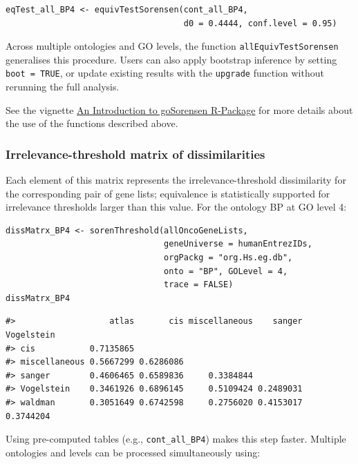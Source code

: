 \begin{verbatim}
eqTest_all_BP4 <- equivTestSorensen(cont_all_BP4,
                                    d0 = 0.4444, conf.level = 0.95)
\end{verbatim}

Across multiple ontologies and GO levels, the function \texttt{allEquivTestSorensen} generalises this procedure. Users can also apply bootstrap inference by setting \texttt{boot\ =\ TRUE}, or update existing results with the \texttt{upgrade} function without rerunning the full analysis.

See the vignette \href{https://www.bioconductor.org/packages/release/bioc/vignettes/goSorensen/inst/doc/goSorensen_Introduction.html}{An Introduction to goSorensen R-Package} for more details about the use of the functions described above.

\subsubsection{Irrelevance-threshold matrix of dissimilarities}\label{irrelevance-threshold-matrix-of-dissimilarities}

Each element of this matrix represents the irrelevance-threshold dissimilarity for the corresponding pair of gene lists; equivalence is statistically supported for irrelevance thresholds larger than this value. For the ontology BP at GO level 4:

\begin{verbatim}
dissMatrx_BP4 <- sorenThreshold(allOncoGeneLists,
                                geneUniverse = humanEntrezIDs, 
                                orgPackg = "org.Hs.eg.db",
                                onto = "BP", GOLevel = 4,
                                trace = FALSE)
dissMatrx_BP4
\end{verbatim}

\begin{verbatim}
#>                   atlas       cis miscellaneous    sanger Vogelstein
#> cis           0.7135865                                             
#> miscellaneous 0.5667299 0.6286086                                   
#> sanger        0.4606465 0.6589836     0.3384844                     
#> Vogelstein    0.3461926 0.6896145     0.5109424 0.2489031           
#> waldman       0.3051649 0.6742598     0.2756020 0.4153017  0.3744204
\end{verbatim}

Using pre-computed tables (e.g., \texttt{cont\_all\_BP4}) makes this step faster. Multiple ontologies and levels can be processed simultaneously using:

